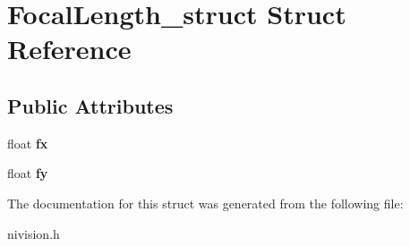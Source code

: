 \hypertarget{structFocalLength__struct}{
\section{FocalLength\_\-struct Struct Reference}
\label{structFocalLength__struct}
}
\subsection*{Public Attributes}
\begin{DoxyCompactItemize}
\item 
\hypertarget{structFocalLength__struct_af703fad89b79d8c96013c4c3cf2c79ee}{
float {\bfseries fx}}
\label{structFocalLength__struct_af703fad89b79d8c96013c4c3cf2c79ee}

\item 
\hypertarget{structFocalLength__struct_ad788f4d87309e56fee1dc73f615bb3e8}{
float {\bfseries fy}}
\label{structFocalLength__struct_ad788f4d87309e56fee1dc73f615bb3e8}

\end{DoxyCompactItemize}


The documentation for this struct was generated from the following file:\begin{DoxyCompactItemize}
\item 
nivision.h\end{DoxyCompactItemize}
